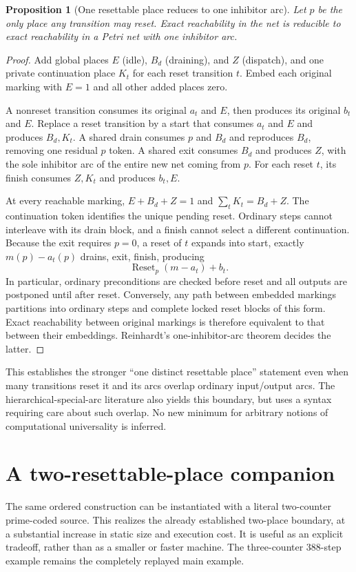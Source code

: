 \documentclass[11pt,letterpaper]{article}
\newtheorem{proposition}[theorem]{Proposition}
\theoremstyle{definition}
\theoremstyle{remark}
\begin{document}
\begin{proposition}[One resettable place reduces to one inhibitor arc]
Let $p$ be the only place any transition may reset. Exact reachability in the net is reducible to exact reachability in a Petri net with one inhibitor arc.
\end{proposition}
\begin{proof}
Add global places $E$ (idle), $B_d$ (draining), and $Z$ (dispatch), and one private continuation place $K_t$ for each reset transition $t$. Embed each original marking with $E=1$ and all other added places zero.

A nonreset transition consumes its original $a_t$ and $E$, then produces its original $b_t$ and $E$. Replace a reset transition by a start that consumes $a_t$ and $E$ and produces $B_d,K_t$. A shared drain consumes $p$ and $B_d$ and reproduces $B_d$, removing one residual $p$ token. A shared exit consumes $B_d$ and produces $Z$, with the sole inhibitor arc of the entire new net coming from $p$. For each reset $t$, its finish consumes $Z,K_t$ and produces $b_t,E$.

At every reachable marking, $E+B_d+Z=1$ and $\sum_tK_t=B_d+Z$. The continuation token identifies the unique pending reset. Ordinary steps cannot interleave with its drain block, and a finish cannot select a different continuation. Because the exit requires $p=0$, a reset of $t$ expands into start, exactly $m(p)-a_t(p)$ drains, exit, finish, producing
\[
 \operatorname{Reset}_p(m-a_t)+b_t.
\]
In particular, ordinary preconditions are checked before reset and all outputs are postponed until after reset. Conversely, any path between embedded markings partitions into ordinary steps and complete locked reset blocks of this form. Exact reachability between original markings is therefore equivalent to that between their embeddings. Reinhardt's one-inhibitor-arc theorem decides the latter.
\end{proof}
This establishes the stronger ``one distinct resettable place'' statement even when many transitions reset it and its arcs overlap ordinary input/output arcs. The hierarchical-special-arc literature also yields this boundary, but uses a syntax requiring care about such overlap. No new minimum for arbitrary notions of computational universality is inferred.

\section{A two-resettable-place companion}
\label{qoc:rn:sec:two}
The same ordered construction can be instantiated with a literal two-counter prime-coded source. This realizes the already established two-place boundary, at a substantial increase in static size and execution cost. It is useful as an explicit tradeoff, rather than as a smaller or faster machine. The three-counter 388-step example remains the completely replayed main example.
\end{document}
